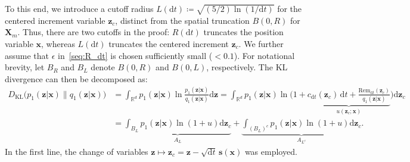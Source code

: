 To this end, we introduce a cutoff radius $L(\mathrm dt)\coloneq \sqrt{(5/2)\ln(1/\mathrm dt)}$ for the centered increment variable $\bm z_c$, distinct from the spatial truncation $B(0,R)$ for $\bm X_m$. Thus, there are two cutoffs in the proof: $R(\mathrm dt)$ truncates the position variable $\bm x$, whereas $L(\mathrm dt)$ truncates the centered increment $\bm z_c$. 
We further assume that $\epsilon$ in~\eqref{seq:R_dt} is chosen sufficiently small ($<0.1$). For notational brevity, let $B_R$ and $B_L$ denote $B(0,R)$ and $B(0,L)$, respectively. The KL divergence can then be decomposed as:
\begin{equation}
\begin{aligned}
    D_{\mathrm{KL}}\big(p_1(\bm z|\bm x)\|q_1(\bm z|\bm x)\big)
    &=\int_{\mathbb R^d}p_1(\bm z|\bm x)\ln\frac{p_1(\bm z|\bm x)}{q_1(\bm z|\bm x)}\mathrm d\bm z
    =\int_{\mathbb R^d}p_1(\bm z|\bm x)\ln\Bigg(1+
    \underbrace{
    c_{\mathrm dt}(\bm z_c)\,\mathrm dt+\frac{\mathrm{Rem}_{\mathrm dt}(\bm z_c)}{q_1(\bm z|\bm x)}
    }_{u(\bm z_c;\bm x)}
    \Bigg)\mathrm d\bm z_c
    \\
    &=
    \underbrace{
    \int_{B_L}\!\!p_1(\bm z|\bm x)\ln(1+u)\mathrm d\bm z_c
    }_{A_L}
    +
    \underbrace{
    \int_{(B_L)^c}\!\!p_1(\bm z|\bm x)\ln(1+u)\mathrm d\bm z_c
    }_{A_{L^c}}.
    \label{seq:A_D_KL_integral}
\end{aligned}
\end{equation}
In the first line, the change of variables $\bm z\mapsto\bm z_c=\bm z-\sqrt{\mathrm dt}\,\bm s(\bm x)$ was employed.


